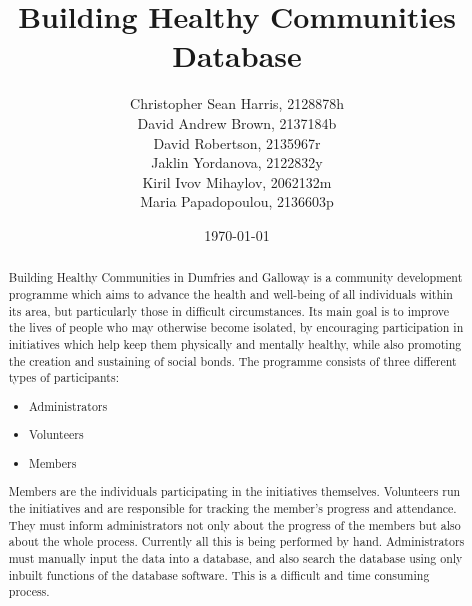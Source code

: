 \documentclass{l3proj}
\begin{document}
\title{Building Healthy Communities Database}

\author{
Christopher Sean Harris, 2128878h \\
David Andrew Brown, 2137184b \\
David Robertson, 2135967r \\
Jaklin Yordanova, 2122832y \\
Kiril Ivov Mihaylov, 2062132m \\
Maria Papadopoulou, 2136603p}

\date{\today}

\maketitle

\begin{abstract}

Building Healthy Communities in Dumfries and Galloway is a community development programme which aims to advance the health and well-being of all individuals within its area, but particularly those in difficult circumstances. Its main goal is to improve the lives of people who may otherwise become isolated, by encouraging participation in initiatives which help keep them physically and mentally healthy, while also promoting the creation and sustaining of social bonds. The programme consists of three different types of participants:
\begin{itemize}
	\item Administrators
	\item Volunteers
	\item Members
\end{itemize}
Members are the individuals participating in the initiatives themselves. Volunteers run the initiatives and are responsible for tracking the member's progress and attendance. They must inform administrators not only about the progress of the members but also about the whole process. Currently all this is being performed by hand. Administrators must manually input the data into a database, and also search the database using only inbuilt functions of the database software. This is a difficult and time consuming process.


\end{abstract}
\end{document}
